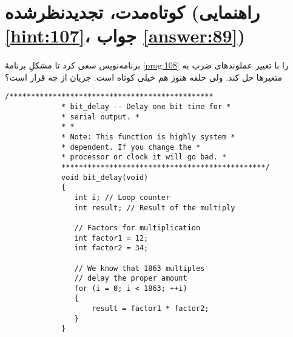 \section[کوتاه‌مدت، تجدیدنظرشده]{کوتاه‌مدت، تجدیدنظرشده \protect{} (راهنمایی \ref{hint:107}، جواب \ref{answer:89})}
\paragraph{}\label{prog:109}
برنامه‌نویس سعی کرد تا مشکلِ برنامهٔ \ref{prog:108} را با تغییر عملوندهای ضرب به متغیرها حل کند. ولی حلقه هنوز هم خیلی کوتاه است. جریان از چه قرار است؟

\begin{LTR}
        \begin{lstlisting}[style=C++Style]
             /***********************************************
             * bit_delay -- Delay one bit time for *
             * serial output. *
             * *
             * Note: This function is highly system *
             * dependent. If you change the *
             * processor or clock it will go bad. *
             ***********************************************/
             void bit_delay(void)
             {
             	int i; // Loop counter
             	int result; // Result of the multiply

             	// Factors for multiplication
             	int factor1 = 12;
             	int factor2 = 34;

             	// We know that 1863 multiples
             	// delay the proper amount
             	for (i = 0; i < 1863; ++i)
             	{
             		result = factor1 * factor2;
             	}
             }
        \end{lstlisting}
\end{LTR}
